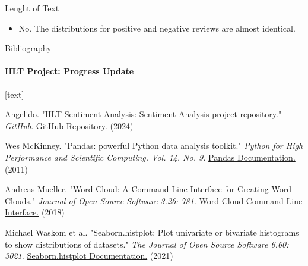\documentclass{beamer}
\theoremstyle{definition}
\theoremstyle{plain}
\begin{document}
\begin{frame}{Lenght of Text}
{\begin{itemize}
    \item No. The distributions for positive and negative reviews are almost identical.
\end{itemize}

}
\end{frame}


\begin{frame}{Bibliography}
\framesubtitle{HLT Project: Progress Update}

\begin{thebibliography}{9}
[text]
{\small

 Angelido. "HLT-Sentiment-Analysis: Sentiment Analysis project repository." \emph{GitHub}. \href{https://github.com/Angelido/HLT-Sentiment-Analysis}{GitHub Repository.} (2024)

 Wes McKinney. "Pandas: powerful Python data analysis toolkit." \emph{Python for High Performance and Scientific Computing. Vol. 14. No. 9.} \href{https://pandas.pydata.org/docs/}{Pandas Documentation.} (2011)

 Andreas Mueller. "Word Cloud: A Command Line Interface for Creating Word Clouds." \emph{Journal of Open Source Software 3.26: 781}. \href{https://amueller.github.io/word_cloud/cli.html}{Word Cloud Command Line Interface.} (2018)

 Michael Waskom et al. "Seaborn.histplot: Plot univariate or bivariate histograms to show distributions of datasets." \emph{The Journal of Open Source Software 6.60: 3021.} \href{https://seaborn.pydata.org/generated/seaborn.histplot.html}{Seaborn.histplot Documentation.} (2021)
}
\end{thebibliography}
    
\end{frame}

\backmatter
\end{document}
